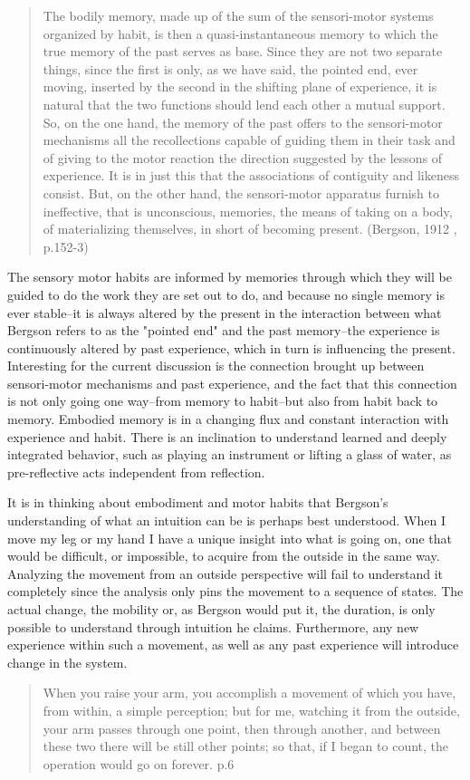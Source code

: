 \documentclass[11pt]{article}
\makeatletter
\newcommand{\cslcitation}[2]
 {\protect\hyper@linkstart{cite}{citeproc_bib_item_#1}#2\hyper@linkend}
\makeatother
\begin{document}
\begin{quote}
The bodily memory, made up of the sum of the sensori-motor systems organized by habit, is then a quasi-instantaneous memory to which the true memory of the past serves as base. Since they are not two separate things, since the first is only, as we have said, the pointed end, ever moving, inserted by the second in the shifting plane of experience, it is natural that the two functions should lend each other a mutual support. So, on the one hand, the memory of the past offers to the sensori-motor mechanisms all the recollections capable of guiding them in their task and of giving to the motor reaction the direction suggested by the lessons of experience. It is in just this that the associations of contiguity and likeness consist. But, on the other hand, the sensori-motor apparatus furnish to ineffective, that is unconscious, memories, the means of taking on a body, of materializing themselves, in short of becoming present. (\cslcitation{2}{Bergson, 1912} , p.152-3)
\end{quote}

The sensory motor habits are informed by memories through which they will be guided to do the work they are set out to do, and because no single memory is ever stable--it is always altered by the present in the interaction between what Bergson refers to as the "pointed end" and the past memory--the experience is continuously altered by past experience, which in turn is influencing the present.
Interesting for the current discussion is the connection brought up between sensori-motor mechanisms and past experience, and the fact that this connection is not only going one way--from memory to habit--but also from habit back to memory.
Embodied memory is in a changing flux and constant interaction with experience and habit.
There is an inclination to understand learned and deeply integrated behavior, such as playing an instrument or lifting a glass of water, as pre-reflective acts independent from reflection.

It is in thinking about embodiment and motor habits that Bergson's understanding of what an intuition can be is perhaps best understood.
When I move my leg or my hand I have a unique insight into what is going on, one that would be difficult, or impossible, to acquire from the outside in the same way.
Analyzing the movement from an outside perspective will fail to understand it completely since the analysis only pins the movement to a sequence of states.
The actual change, the mobility or, as Bergson would put it, the duration, is only possible to understand through intuition he claims.
Furthermore, any new experience within such a movement, as well as any past experience will introduce change in the system.
\begin{quote}
When you raise your arm, you accomplish a movement of which you have, from within, a simple perception; but for me, watching it from the outside, your arm passes through one point, then through another, and between these two there will be still other points; so that, if I began to count, the operation would go on forever. p.6
\end{quote}
\end{document}
